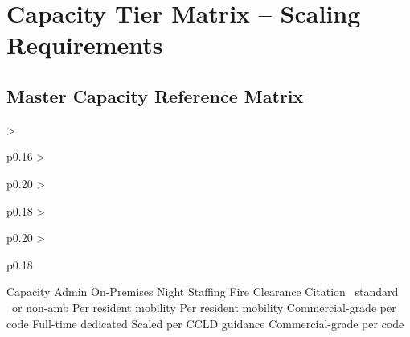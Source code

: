%
\section{Capacity Tier Matrix -- Scaling Requirements}

\subsection{Master Capacity Reference Matrix}
\begin{cheattablefive}
  {>{\raggedright\arraybackslash}p{0.16\linewidth}
   >{\raggedright\arraybackslash}p{0.20\linewidth}
   >{\raggedright\arraybackslash}p{0.18\linewidth}
   >{\raggedright\arraybackslash}p{0.20\linewidth}
   >{\raggedright\arraybackslash}p{0.18\linewidth}}
  {Capacity}
  {Admin On-Premises}
  {Night Staffing}
  {Fire Clearance}
  {Citation}
\trrrr{\capSix}
      {\adminHrsSmall}
      {\nightOnCall}
      {\fireSelfPres\ standard}
      {}
\trrrr{\capMid}
      {\adminHrsSmall}
      {\nightOnCall}
      {\fireSelfPres\ or non-amb}
      {}
\trrrr{\capLarge}
      {\adminHrsLarge}
      {\nightOneAwake}
      {Per resident mobility}
      {}
\trrrr{\capXL}
      {\adminHrsLarge}
      {\nightOneAwake}
      {Per resident mobility}
      {}
\trrrr{\capXXL}
      {\adminHrsLarge}
      {\nightTwoAwake}
      {Commercial-grade per code}
      {}
\trrrr{\capMax}
      {Full-time dedicated}
      {Scaled per CCLD guidance}
      {Commercial-grade per code}
      {}
\end{cheattablefive}

